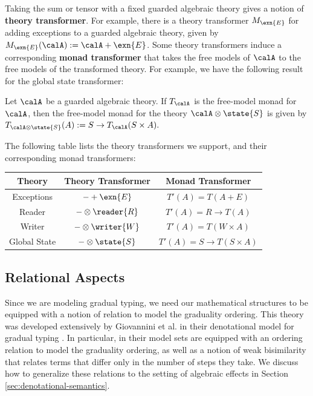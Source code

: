 \documentclass[acmsmall,screen,review,anonymous]{acmart}
\theoremstyle{remark}
\begin{document}
Taking the sum or tensor with a fixed guarded algebraic theory gives a notion of
\textbf{theory transformer}.
%
For example, there is a theory transformer $M_{\exn{E}}$ for adding exceptions
to a guarded algebraic theory, given by $M_{\exn{E}}(\calA) := \calA + \exn{E}$.
Some theory transformers induce a corresponding \textbf{monad transformer} that
takes the free models of $\calA$ to the free models of the transformed theory.
For example, we have the following result for the global state transformer:
%
\begin{theorem}\label{thm:state-monad-transformer}  
Let $\calA$ be a guarded algebraic theory. If $T_\calA$ is the free-model monad
for $\calA$, then the free-model monad for the theory $\calA \otimes \state{S}$
is given by
%
$T_{\calA \otimes \state{S}}(A) := S \to T_\calA(S \times A).$
%
\end{theorem}
%
The following table lists the theory transformers we
support, and their corresponding monad transformers:
\begin{center}
  \begin{tabular}{|c|c|c|}
    \hline
    Theory       & Theory Transformer         & Monad Transformer \\
    \hline
    Exceptions   & $- + \exn{E}$          & $T'(A) = T(A + E)$ \\
    Reader       & $- \otimes \reader{R}$ & $T'(A) = R \to T(A)$ \\
    Writer       & $- \otimes \writer{W}$ & $T'(A) = T(W \times A)$ \\
    Global State & $- \otimes \state{S}$  & $T'(A) = S \to T(S \times A)$ \\
    \hline
  \end{tabular}
\end{center}

\subsection{Relational Aspects}

Since we are modeling gradual typing, we need our mathematical structures to be
equipped with a notion of relation to model the graduality ordering. This theory
was developed extensively by Giovannini et al. in their denotational model for
gradual typing \cite{gtt-sgdt}. In particular, in their model sets are equipped
with an ordering relation to model the graduality ordering, as well as a notion
of weak bisimilarity that relates terms that differ only in the number of steps
they take. We discuss how to generalize these relations to the setting of
algebraic effects in Section \ref{sec:denotational-semantics}.
\end{document}
